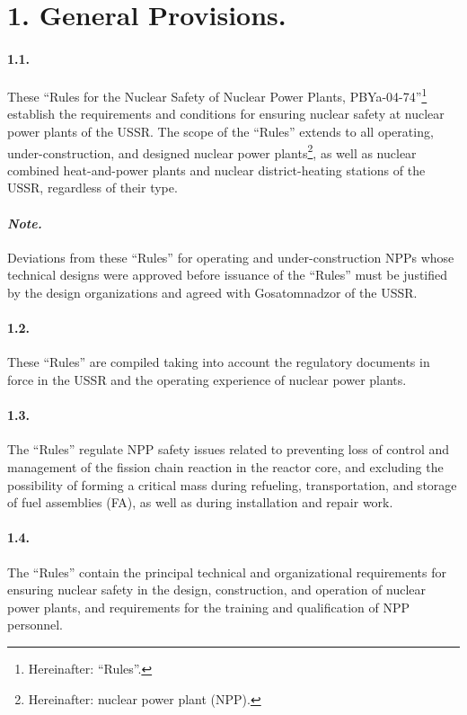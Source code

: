 \documentclass[openright]{bookest}
\begin{document}
\section*{1. General Provisions.}

\paragraph{1.1.} These ``Rules for the Nuclear Safety of Nuclear Power Plants, PBYa-04-74''\footnote{Hereinafter: ``Rules''.} establish the requirements and conditions for ensuring nuclear safety at nuclear power plants of the USSR. The scope of the ``Rules'' extends to all operating, under-construction, and designed nuclear power plants\footnote{Hereinafter: nuclear power plant (NPP).}, as well as nuclear combined heat-and-power plants and nuclear district-heating stations of the USSR, regardless of their type.

\paragraph{\emph{Note.}} Deviations from these ``Rules'' for operating and under-construction NPPs whose technical designs were approved before issuance of the ``Rules'' must be justified by the design organizations and agreed with Gosatomnadzor of the USSR.

\paragraph{1.2.} These ``Rules'' are compiled taking into account the regulatory documents in force in the USSR and the operating experience of nuclear power plants.

\paragraph{1.3.} The ``Rules'' regulate NPP safety issues related to preventing loss of control and management of the fission chain reaction in the reactor core, and excluding the possibility of forming a critical mass during refueling, transportation, and storage of fuel assemblies (FA), as well as during installation and repair work.

\paragraph{1.4.} The ``Rules'' contain the principal technical and organizational requirements for ensuring nuclear safety in the design, construction, and operation of nuclear power plants, and requirements for the training and qualification of NPP personnel.
\end{document}
